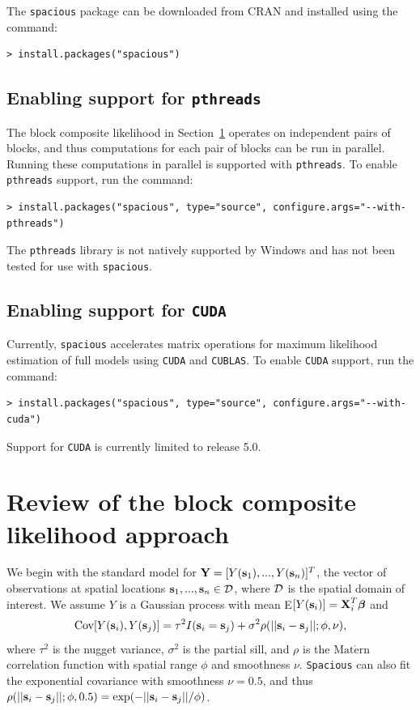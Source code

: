 \documentclass[11pt]{article}
\newcommand{\bbeta}{ \mbox{\boldmath $\beta$}}
\newcommand{\bX}{ \mbox{\bf X}}
\newcommand{\bY}{ \mbox{\bf Y}}
\newcommand{\bs}{ \mbox{\bf s}}
\newcommand{\calD}{{\cal D}}
\newcommand{\Matern}{ \mbox{Mat$\acute{\mbox{e}}$rn}}
\begin{document}
The {\tt spacious} package can be downloaded from CRAN and installed using the command:

\begin{verbatim}
> install.packages("spacious")
\end{verbatim}

\subsection{Enabling support for {\tt pthreads}}

The block composite likelihood in Section~\ref{s:review} operates on independent pairs of blocks, and thus computations for each pair of blocks can be run in parallel.
Running these computations in parallel is supported with {\tt pthreads}.
To enable {\tt pthreads} support, run the command:

\begin{verbatim}
> install.packages("spacious", type="source", configure.args="--with-pthreads")
\end{verbatim}
The {\tt pthreads} library is not natively supported by Windows and has not been tested for use with {\tt spacious}.

\subsection{Enabling support for {\tt CUDA}}

Currently, {\tt spacious} accelerates matrix operations for maximum likelihood estimation of full models using {\tt CUDA} and {\tt CUBLAS}.
To enable {\tt CUDA} support, run the command:

\begin{verbatim}
> install.packages("spacious", type="source", configure.args="--with-cuda")
\end{verbatim}
Support for {\tt CUDA} is currently limited to release 5.0.

\section{Review of the block composite likelihood approach}\label{s:review}

We begin with the standard model for $\bY = [Y(\bs_1),...,Y(\bs_n)]^T$, the vector of observations at spatial locations $\bs_1,...,\bs_n\in \calD$, where $\calD$ is the spatial domain of interest.
We assume $Y$ is a Gaussian process with mean E$[Y(\bs_i)]=\bX_i^T\bbeta$ and $$\mbox{Cov}[Y(\bs_i),Y(\bs_j)]=\tau^2I(\bs_i=\bs_j) +\sigma^2\rho(||\bs_i-\bs_j||;\phi,\nu),$$
where $\tau^2$ is the nugget variance, $\sigma^2$ is the partial sill, and $\rho$ is the $\Matern$ correlation function with spatial range $\phi$ and smoothness $\nu$.
{\tt Spacious} can also fit the exponential covariance with smoothness $\nu=0.5$, and thus $\rho(||\bs_i-\bs_j||;\phi,0.5) = \exp(-||\bs_i-\bs_j||/\phi)$.
\end{document}
